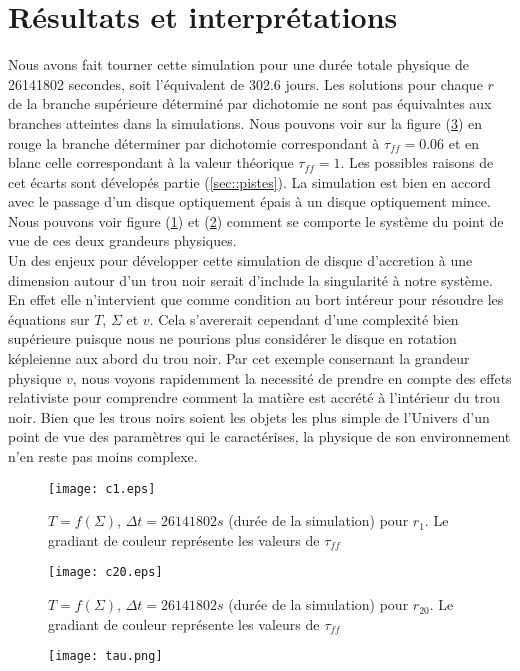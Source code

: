 \section{Résultats et interprétations}

Nous avons fait tourner cette simulation pour une durée totale physique de 26141802 secondes, soit l'équivalent de 302.6 jours. 
Les solutions pour chaque $r$ de la branche supérieure déterminé par dichotomie ne sont pas équivalntes aux branches atteintes dans la simulations. Nous pouvons voir sur la figure (\ref{fig:tau.png}) en rouge la branche déterminer par dichotomie correspondant à $\tau_{ff} = 0.06 $ et en blanc celle correspondant à la valeur théorique $\tau_{ff} = 1$. Les possibles raisons de cet écarts sont dévelopés partie (\ref{sec::pistes}). La simulation est bien en accord avec le passage d'un disque optiquement épais à un disque optiquement mince. Nous pouvons voir figure (\ref{fig:c1.eps}) et (\ref{fig:c20.eps}) comment se comporte le système du point de vue de ces deux grandeurs physiques.  \\


Un des enjeux pour développer cette simulation de disque d'accretion à une dimension autour d'un trou noir serait d'include la singularité à notre système. En effet elle n'intervient que comme condition au bort intéreur pour résoudre les équations sur $T$, $\Sigma$ et $v$. Cela s'avererait cependant d'une complexité bien supérieure puisque nous ne pourions plus considérer le disque en rotation képleienne aux abord du trou noir. Par cet exemple consernant la grandeur physique $v$, nous voyons rapidemment la necessité de prendre en compte des effets relativiste pour comprendre comment la matière est accrété à l'intérieur du trou noir. Bien que les trous noirs soient les objets les plus simple de l'Univers d'un point de vue des paramètres qui le caractérises, la physique de son environnement n'en reste pas moins complexe. 
 

\begin{figure}
  \begin{center}
    \texttt{[image: c1.eps]}
  \end{center}
  \caption{$T=f(\Sigma)$, $\Delta t = 26141802 s$ (durée de la simulation) pour $r_{1}$. Le gradiant de couleur représente les valeurs de $\tau_{ff}$}
  \label{fig:c1.eps}
\end{figure} 

\begin{figure}
  \begin{center}
    \texttt{[image: c20.eps]}
  \end{center}
  \caption{$T=f(\Sigma)$, $\Delta t = 26141802 s$ (durée de la simulation) pour $r_{20}$. Le gradiant de couleur représente les valeurs de $\tau_{ff}$}
  \label{fig:c20.eps}
\end{figure}


\begin{figure}
  \begin{center}
    \texttt{[image: tau.png]}
  \end{center}
  \caption{}
  \label{fig:tau.png}
\end{figure} 

